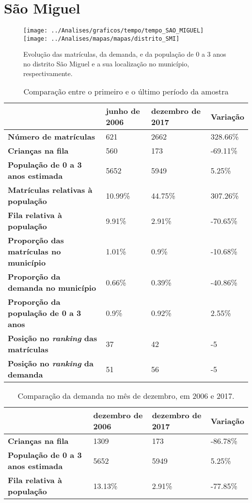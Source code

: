 \section{São Miguel}
\begin{figure}[H]
\centering
\texttt{[image: ../Analises/graficos/tempo/tempo\_SAO\_MIGUEL]}
\texttt{[image: ../Analises/mapas/mapas/distrito\_SMI]}
\caption{Evolução das matrículas, da demanda, e da população de 0 a 3 anos no distrito São Miguel e a sua localização no município, respectivamente.}
\end{figure}
\begin{table}[H]
\begin{tabular}{l|l|l|l}
\textbf{}                                      & \textbf{junho de 2006}       & \textbf{dezembro de 2017}    & \textbf{Variação} \\ \hline
\textbf{Número de matrículas}                  & 621 & 2662 & 328.66\% \\ \hline
\textbf{Crianças na fila}                      & 560 & 173 & -69.11\% \\ \hline
\textbf{População de 0 a 3 anos estimada}      & 5652 & 5949 & 5.25\% \\ \hline
\textbf{Matrículas relativas à população}      & 10.99\% & 44.75\% & 307.26\% \\ \hline
\textbf{Fila relativa à população}             & 9.91\% & 2.91\% & -70.65\% \\ \hline
\textbf{Proporção das matrículas no município} & 1.01\% & 0.9\% & -10.68\% \\ \hline
\textbf{Proporção da demanda no município}     & 0.66\% & 0.39\% & -40.86\% \\ \hline
\textbf{Proporção da população de 0 a 3 anos}  & 0.9\% & 0.92\% & 2.55\% \\ \hline
\textbf{Posição no \textit{ranking} das matrículas}     & 37 & 42 & -5 \\ \hline
\textbf{Posição no \textit{ranking} da demanda}         & 51 & 56 & -5 \\ 
\end{tabular}
\caption{Comparação entre o primeiro e o último período da amostra}
\end{table}
\begin{table}[H]
\begin{tabular}{l|l|l|l}
\textbf{}                                 & \textbf{dezembro de 2006} & \textbf{dezembro de 2017} & \textbf{Variação} \\ \hline
\textbf{Crianças na fila}                      & 1309 & 173 & -86.78\% \\ \hline
\textbf{População de 0 a 3 anos estimada}      & 5652 & 5949 & 5.25\% \\ \hline
\textbf{Fila relativa à população}             & 13.13\% & 2.91\% & -77.85\% \\
\end{tabular}
\caption{Comparação da demanda no mês de dezembro, em 2006 e 2017.}
\end{table}
